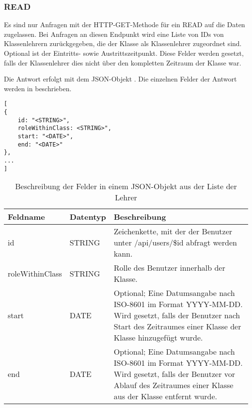 \subsubsection{READ}
\label{sec:rest:api:classes:id:users:read}
Es sind nur Anfragen mit der HTTP-GET-Methode für ein READ auf die Daten zugelassen.
Bei Anfragen an diesen Endpunkt wird eine Liste von IDs von Klassenlehrern zurückgegeben, die der Klasse als Klassenlehrer zugeordnet sind.
Optional ist der Eintritts- sowie Austrittszeitpunkt. Diese Felder werden gesetzt, falls der Klassenlehrer dies nicht über den kompletten Zeitraum der Klasse war.

Die Antwort erfolgt mit dem JSON-Objekt . 
Die einzelnen Felder der Antwort werden in  beschrieben.

\begin{lstlisting}[caption={JSON-Antwort für einen GET-Aufruf des Pfads /api/classes/\$id/users},label={lst:code:rest:api:classes:id:users:read:ret},frame=tlrb]
[
{
    id: "<STRING>",
    roleWithinClass: <STRING>",
    start: "<DATE>",
    end: "<DATE>"    
},
...
]
\end{lstlisting}

\begin{longtable}{|p{}|p{}|p{}|}
		\caption{Beschreibung der Felder in einem JSON-Objekt aus der Liste der Lehrer}
\endfoot
		\caption{Beschreibung der Felder in einem JSON-Objekt aus der Liste der Lehrer}
		\label{tab:rest:api:classes:id:users:read:ret}
\endlastfoot 
\hline
			\textbf{Feldname} & \textbf{Datentyp} & \textbf{Beschreibung} \\ \hline
\endhead
id & STRING & Zeichenkette, mit der der Benutzer unter /api/users/\$id abfragt werden kann. \\ \hline
roleWithinClass & STRING & Rolle des Benutzer innerhalb der Klasse. \\ \hline
start & DATE & Optional; Eine Datumsangabe nach ISO-8601 im Format YYYY-MM-DD. Wird gesetzt, falls der Benutzer nach Start des Zeitraumes einer Klasse der Klasse hinzugefügt wurde. \\ \hline
end & DATE & Optional; Eine Datumsangabe nach ISO-8601 im Format YYYY-MM-DD. Wird gesetzt, falls der Benutzer vor Ablauf des Zeitraumes einer Klasse aus der Klasse entfernt wurde. \\ \hline
\end{longtable}
